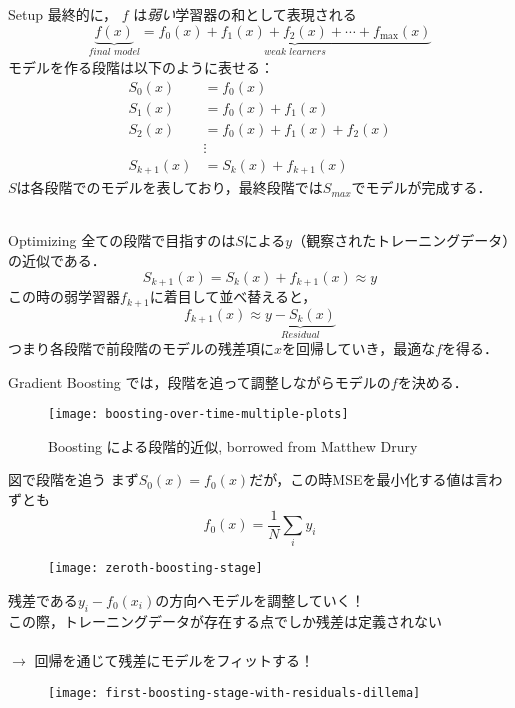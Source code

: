 \begin{frame}{Setup}
最終的に， $f$ は\textit{弱い}学習器の和として表現される
$$ \underbrace{f(x)}_{\textit{final model}} \!\!\!\!\! = \underbrace{f_0(x) + f_1(x) + f_2(x) + \cdots + f_{\text{max}}(x)}_{\textit{weak learners}} $$
モデルを作る段階は以下のように表せる：
\begin{align*}
    S_0(x) &= f_0(x) \\
    S_1(x) &= f_0(x) + f_1(x) \\
    S_2(x) &= f_0(x) + f_1(x) + f_2(x) \\
    &\vdots \\
    S_{k + 1} (x) &= S_{k}(x) + f_{k+1}(x)
\end{align*}
$S$は各段階でのモデルを表しており，最終段階では$S_{max}$でモデルが完成する．\\~\\

\end{frame} 
%
\begin{frame}{Optimizing}
全ての段階で目指すのは$S$による$y$（観察されたトレーニングデータ）の近似である．
$$S_{k + 1} (x) = S_{k}(x) + f_{k+1}(x) \approx y$$
この時の弱学習器$f_{k+1}$に着目して並べ替えると，
$$f_{k + 1} (x) \approx \underbrace{y - S_{k}(x)}_{\textit{Residual}}$$
つまり各段階で前段階のモデルの残差項に$x$を回帰していき，最適な$f$を得る．
\end{frame}
%
\begin{frame}
Gradient Boosting では，段階を追って調整しながらモデルの$f$を決める．

  \begin{figure}
    \texttt{[image: boosting-over-time-multiple-plots]}
    \caption{Boosting による段階的近似, borrowed from Matthew Drury}
  \end{figure}
  
\end{frame}
%

\begin{frame}{図で段階を追う}
まず$S_0(x) = f_0(x)$だが，この時MSEを最小化する値は言わずとも
$$ f_0(x) = \frac{1}{N} \sum_i y_i $$
  \begin{figure}
    \texttt{[image: zeroth-boosting-stage]}
  \end{figure}

\end{frame}
%

\begin{frame}
残差である$y_i - f_0(x_i)$の方向へモデルを調整していく！ \\
この際，トレーニングデータが存在する点でしか残差は定義されない \\~\\
$\to$ 回帰を通じて残差にモデルをフィットする！

  \begin{figure}
   \texttt{[image: first-boosting-stage-with-residuals-dillema]}
  \end{figure}
  
\end{frame}
%

